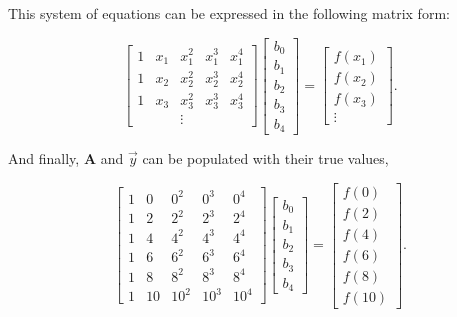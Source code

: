 This system of equations can be expressed in the following matrix form:

\begin{equation} \label{eq:LinAlgSubscript}
\begin{bmatrix}
1 & x_1 & x_1^2 & x_1^3 & x_1^4 \\
1 & x_2 & x_2^2 & x_2^3 & x_2^4 \\
1 & x_3 & x_3^2 & x_3^3 & x_3^4 \\
 & & \vdots & &
\end{bmatrix}
\begin{bmatrix}
b_0 \\
b_1 \\
b_2 \\
b_3 \\
b_4 
\end{bmatrix}
=
\begin{bmatrix}
f(x_1) \\ 
f(x_2) \\
f(x_3) \\ 
\vdots
\end{bmatrix}.
\end{equation}

And finally, $\mathbf{A}$ and $\vec{y}$ can be populated with their true values,

\begin{equation} \label{eq:realValues}
\begin{bmatrix}
1 & 0 & 0^2 & 0^3 & 0^4 \\
1 & 2 & 2^2 & 2^3 & 2^4 \\
1 & 4 & 4^2 & 4^3 & 4^4 \\
1 & 6 & 6^2 & 6^3 & 6^4 \\
1 & 8 & 8^2 & 8^3 & 8^4 \\
1 & 10 & 10^2 & 10^3 & 10^4
\end{bmatrix}
\begin{bmatrix}
b_0 \\
b_1 \\
b_2 \\
b_3 \\
b_4 
\end{bmatrix}
=
\begin{bmatrix}
f(0) \\ 
f(2) \\
f(4) \\ 
f(6) \\
f(8) \\
f(10)
\end{bmatrix}.
\end{equation}


